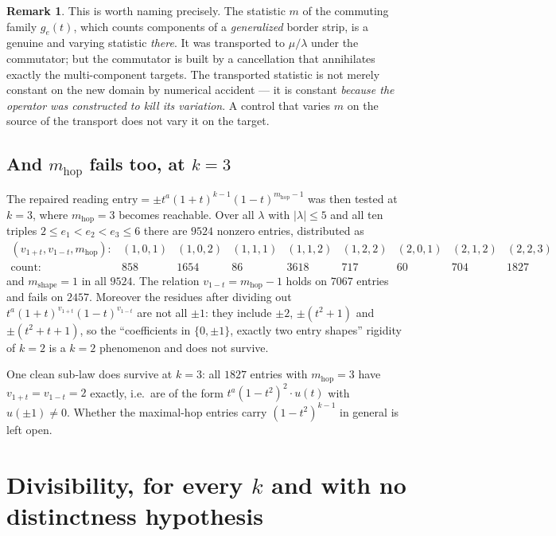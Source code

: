 \documentclass[11pt]{article}
\theoremstyle{definition}
\newtheorem{remark}[theorem]{Remark}
\begin{document}
\begin{remark}
This is worth naming precisely. The statistic $m$ of the commuting family $g_e(t)$, which counts
components of a \emph{generalized} border strip, is a genuine and varying statistic \emph{there}.
It was transported to $\mu/\lambda$ under the commutator; but the commutator is built by a
cancellation that annihilates exactly the multi-component targets. The transported statistic is
not merely constant on the new domain by numerical accident --- it is constant \emph{because the
operator was constructed to kill its variation}. A control that varies $m$ on the source of the
transport does not vary it on the target.
\end{remark}

\subsection{And $m_{\mathrm{hop}}$ fails too, at $k=3$}

The repaired reading $\text{entry}=\pm t^a(1+t)^{k-1}(1-t)^{m_{\mathrm{hop}}-1}$ was then tested
at $k=3$, where $m_{\mathrm{hop}}=3$ becomes reachable. Over all $\lambda$ with $|\lambda|\le5$
and all ten triples $2\le e_1<e_2<e_3\le6$ there are $9524$ nonzero entries, distributed as
\[
\begin{array}{lccccccccc}
(v_{1+t},v_{1-t},m_{\mathrm{hop}}): &
(1,0,1) & (1,0,2) & (1,1,1) & (1,1,2) & (1,2,2) & (2,0,1) & (2,1,2) & (2,2,3)\\
\text{count}: & 858 & 1654 & 86 & 3618 & 717 & 60 & 704 & 1827
\end{array}
\]
and $m_{\mathrm{shape}}=1$ in all $9524$. The relation $v_{1-t}=m_{\mathrm{hop}}-1$ holds on
$7067$ entries and fails on $2457$. Moreover the residues after dividing out
$t^a(1+t)^{v_{1+t}}(1-t)^{v_{1-t}}$ are not all $\pm1$: they include $\pm2$, $\pm(t^2+1)$ and
$\pm(t^2+t+1)$, so the ``coefficients in $\{0,\pm1\}$, exactly two entry shapes'' rigidity of
$k=2$ is a $k=2$ phenomenon and does not survive.

One clean sub-law does survive at $k=3$: all $1827$ entries with $m_{\mathrm{hop}}=3$ have
$v_{1+t}=v_{1-t}=2$ exactly, i.e.\ are of the form $t^a(1-t^2)^2\cdot u(t)$ with $u(\pm1)\ne0$.
Whether the maximal-hop entries carry $(1-t^2)^{k-1}$ in general is left open.

\section{Divisibility, for every $k$ and with no distinctness hypothesis}
\end{document}

